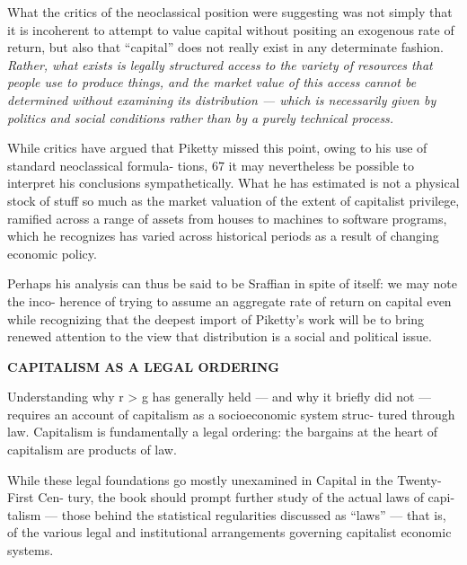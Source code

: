 \documentclass[
]{book}
\begin{document}
What the critics of the neoclassical position were suggesting was
not simply that it is incoherent
to attempt to value capital without positing an exogenous rate of return,
but also that ``capital'' does not really exist in any determinate
fashion.
\emph{Rather, what exists is legally structured access to the variety
of resources that people use to produce things, and the market value of
this access cannot be determined without examining its distribution ---
which is necessarily given by politics and social conditions rather than
by a purely technical process.}

While critics have argued that Piketty
missed this point, owing to his use of standard neoclassical formula-
tions, 67 it may nevertheless be possible to interpret his conclusions
sympathetically. What he has estimated is not a physical stock of stuff
so much as the market valuation of the extent of capitalist privilege,
ramified across a range of assets from houses to machines to software
programs, which he recognizes has varied across historical periods as a
result of changing economic policy.

Perhaps his analysis
can thus be said to be Sraffian in spite of itself: we may note the inco-
herence of trying to assume an aggregate rate of return on capital even
while recognizing that the deepest import of Piketty's work will be to
bring renewed attention to the view that distribution is a social and
political issue.

\textbf{CAPITALISM AS A LEGAL ORDERING}

Understanding why r \textgreater{} g has generally held --- and why it briefly did
not --- requires an account of capitalism as a socioeconomic system struc-
tured through law. Capitalism is fundamentally a legal ordering: the
bargains at the heart of capitalism are products of law.

While these legal
foundations go mostly unexamined in Capital in the Twenty-First Cen-
tury, the book should prompt further study of the actual laws of capi-
talism --- those behind the statistical regularities discussed as ``laws'' ---
that is, of the various legal and institutional arrangements governing
capitalist economic systems.
\end{document}
